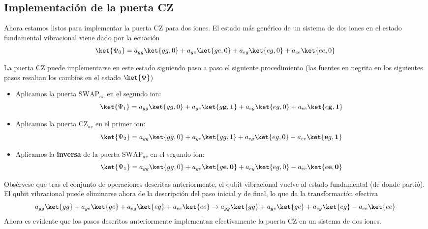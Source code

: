 \subsection{Implementación de la puerta CZ}

Ahora estamos listos para implementar la puerta CZ para dos iones. El estado más genérico de un sistema de dos iones en el estado fundamental vibracional viene dado por la ecuación
	\begin{equation} \label{ec_ions_psi_2_ions}
	\ket{\Psi_0} = a_{gg} \ket{gg,0} + a_{ge} \ket{ge,0} + a_{eg} \ket{eg,0} + a_{ee} \ket{ee,0} 
	\end{equation}


La puerta CZ puede implementarse en este estado siguiendo paso a paso el siguiente procedimiento (las fuentes en negrita en los siguientes pasos resaltan los cambios en el estado $\ket{\Psi}$)
\begin{itemize}
\item Aplicamos la puerta $\text{SWAP}_{av}$ en el segundo ion:
	\begin{equation}
	\ket{\Psi_1} = a_{gg} \ket{gg,0} + a_{ge} \ket{g\mathbf{g},\mathbf{1}} + a_{eg} \ket{eg,0} + a_{ee} \ket{e\mathbf{g},\mathbf{1}}  
	\end{equation}
	
\item Aplicamos la puerta $\text{CZ}_{av}$ en el primer ion:
	\begin{equation}
	\ket{\Psi_2} = a_{gg} \ket{gg,0} + a_{ge} \ket{gg,1} + a_{eg} \ket{eg,0} - a_{ee} \ket{\mathbf{e}g,\mathbf{1}}  
	\end{equation}
	
\item Aplicamos la \textbf{inversa} de la puerta $\text{SWAP}_{av}$ en el segundo ion:
	\begin{equation}
	\ket{\Psi_1} = a_{gg} \ket{gg,0} + a_{ge} \ket{g\mathbf{e},\mathbf{0}} + a_{eg} \ket{eg,0} - a_{ee} \ket{e\mathbf{e},\mathbf{0}}  
	\end{equation}
\end{itemize}

Obsérvese que tras el conjunto de operaciones descritas anteriormente, el qubit vibracional vuelve al estado fundamental (de donde partió). El qubit vibracional puede eliminarse ahora de la descripción del paso inicial y de final, lo que da la transformación efectiva
	\begin{equation}
	a_{gg} \ket{gg} + a_{ge} \ket{ge} + a_{eg} \ket{eg} + a_{ee} \ket{ee}
	\rightarrow
	a_{gg} \ket{gg} + a_{ge} \ket{ge} + a_{eg} \ket{eg} - a_{ee} \ket{ee}
	\end{equation}
Ahora es evidente que los pasos descritos anteriormente implementan efectivamente la puerta CZ en un sistema de dos iones.


